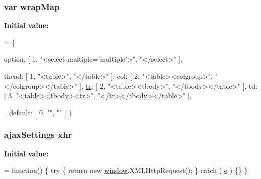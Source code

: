 \subsubsection[{\texorpdfstring{wrap\+Map}{wrapMap}}]{\setlength{\rightskip}{0pt plus 5cm}var wrap\+Map}\hypertarget{jquery-3_82_81_8js_af3142e3869e11d67d095efb9473f2fcf}{}\label{jquery-3_82_81_8js_af3142e3869e11d67d095efb9473f2fcf}
{\bfseries Initial value\+:}
\begin{DoxyCode}
= \{

    
    option: [ 1, \textcolor{stringliteral}{"<select multiple='multiple'>"}, \textcolor{stringliteral}{"</select>"} ],

    
    
    
    thead: [ 1, \textcolor{stringliteral}{"<table>"}, \textcolor{stringliteral}{"</table>"} ],
    col: [ 2, \textcolor{stringliteral}{"<table><colgroup>"}, \textcolor{stringliteral}{"</colgroup></table>"} ],
    \hyperlink{namespacecreate__trie_a41f1ff7b2420aeb95360264a00701e6c}{tr}: [ 2, \textcolor{stringliteral}{"<table><tbody>"}, \textcolor{stringliteral}{"</tbody></table>"} ],
    td: [ 3, \textcolor{stringliteral}{"<table><tbody><tr>"}, \textcolor{stringliteral}{"</tr></tbody></table>"} ],

    \_default: [ 0, \textcolor{stringliteral}{""}, \textcolor{stringliteral}{""} ]
\}
\end{DoxyCode}
\subsubsection[{\texorpdfstring{xhr}{xhr}}]{ ajax\+Settings xhr}\hypertarget{jquery-3_82_81_8js_a0b7a5cb538ca9913b1b3b1c807ad06f0}{}\label{jquery-3_82_81_8js_a0b7a5cb538ca9913b1b3b1c807ad06f0}
{\bfseries Initial value\+:}
\begin{DoxyCode}
= \textcolor{keyword}{function}() \{
    \textcolor{keywordflow}{try} \{
        \textcolor{keywordflow}{return} \textcolor{keyword}{new} \hyperlink{jquery-3_82_81_8js_ad55530ae1e5978df8e721017c1fc8466}{window}.XMLHttpRequest();
    \} \textcolor{keywordflow}{catch} ( \hyperlink{socketio_8min_8js_ab9bf22d472db6a44821bea0ef63ba8c7}{e} ) \{\}
\}
\end{DoxyCode}
